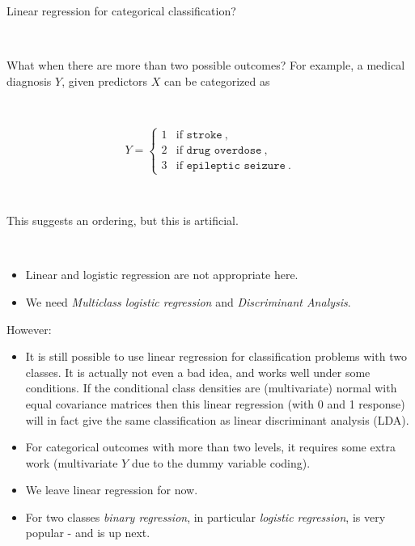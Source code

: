 \documentclass[10pt,ignorenonframetext,]{beamer}
\providecommand{\tightlist}{%
  \setlength{\itemsep}{0pt}\setlength{\parskip}{0pt}}
\begin{document}
\begin{frame}

\begin{block}{Linear regression for categorical classification?}

\(~\)

What when there are more than two possible outcomes? For example, a
medical diagnosis \(Y\), given predictors \(X\) can be categorized as

\(~\)

\[Y = \left\{ \begin{array}{ll}
1 & \text{if } \texttt{stroke} \ , \\
2 & \text{if } \texttt{drug overdose} \ , \\
3 & \text{if } \texttt{epileptic seizure} \ .
\end{array} \right.\]

\(~\)

This suggests an ordering, but this is artificial.

\(~\)

\begin{itemize}
\tightlist
\item
  Linear and logistic regression are not appropriate here.
\item
  We need \emph{Multiclass logistic regression} and \emph{Discriminant
  Analysis}.
\end{itemize}

\end{block}

\end{frame}

\begin{frame}

\begin{block}{However:}

\vspace{2mm}

\begin{itemize}
\item
  It is still possible to use linear regression for classification
  problems with two classes. It is actually not even a bad idea, and
  works well under some conditions. If the conditional class densities
  are (multivariate) normal with equal covariance matrices then this
  linear regression (with 0 and 1 response) will in fact give the same
  classification as linear discriminant analysis (LDA).
\item
  For categorical outcomes with more than two levels, it requires some
  extra work (multivariate \(Y\) due to the dummy variable coding).
\item
  We leave linear regression for now.
\item
  For two classes \emph{binary regression}, in particular \emph{logistic
  regression}, is very popular - and is up next.
\end{itemize}

\end{block}

\end{frame}
\end{document}
